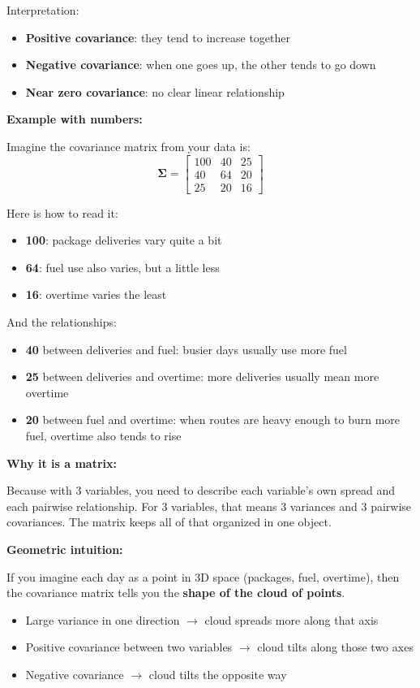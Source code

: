 \documentclass{article}
\begin{document}
\begin{mdframed}
Interpretation:
\begin{itemize}[leftmargin=*]
    \item \textbf{Positive covariance}: they tend to increase together
    \item \textbf{Negative covariance}: when one goes up, the other tends to go down
    \item \textbf{Near zero covariance}: no clear linear relationship
\end{itemize}

\textbf{Example with numbers:}

Imagine the covariance matrix from your data is:
\[
\boldsymbol\Sigma =
\begin{bmatrix}
100 & 40 & 25 \\
40 & 64 & 20 \\
25 & 20 & 16
\end{bmatrix}
\]

Here is how to read it:
\begin{itemize}[leftmargin=*]
    \item \textbf{100}: package deliveries vary quite a bit
    \item \textbf{64}: fuel use also varies, but a little less
    \item \textbf{16}: overtime varies the least
\end{itemize}

And the relationships:
\begin{itemize}[leftmargin=*]
    \item \textbf{40} between deliveries and fuel: busier days usually use more fuel
    \item \textbf{25} between deliveries and overtime: more deliveries usually mean more overtime
    \item \textbf{20} between fuel and overtime: when routes are heavy enough to burn more fuel, overtime also tends to rise
\end{itemize}

\textbf{Why it is a matrix:}

Because with 3 variables, you need to describe each variable's own spread and each pairwise relationship. For 3 variables, that means 3 variances and 3 pairwise covariances. The matrix keeps all of that organized in one object.

\textbf{Geometric intuition:}

If you imagine each day as a point in 3D space (packages, fuel, overtime), then the covariance matrix tells you the \textbf{shape of the cloud of points}.
\begin{itemize}[leftmargin=*]
    \item Large variance in one direction $\rightarrow$ cloud spreads more along that axis
    \item Positive covariance between two variables $\rightarrow$ cloud tilts along those two axes
    \item Negative covariance $\rightarrow$ cloud tilts the opposite way
\end{itemize}


\end{mdframed}
\end{document}
